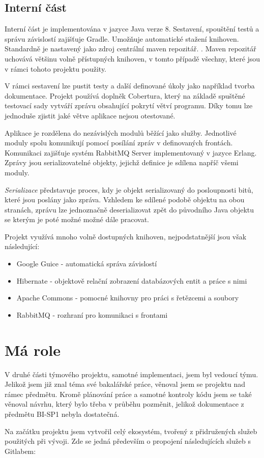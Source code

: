 \documentclass[thesis=B,czech]{FITthesis}[2012/06/26]
\begin{document}
\subsection{Interní část}
Interní část je implementována v jazyce Java verze 8. Sestavení, spouštění testů a správu závislostí zajišťuje Gradle\cite{gradle}.
Umožňuje automatické stažení knihoven. Standardně je nastavený jako zdroj
centrální maven repozitář. \cite{mavenRepo}. Maven repozitář uchovává většinu volně přístupných knihoven, v tomto případě všechny, které jsou v rámci tohoto projektu použity.
\par
V rámci sestavení lze pustit testy a další definované úkoly jako například tvorba dokumentace. Projekt používá
doplněk Cobertura\cite{cobertura}, který na základě spuštěné testovací sady vytváří zprávu obsahující pokrytí větví programu.
Díky tomu lze jednoduše zjistit jaké větve aplikace nejsou otestované.
\par
Aplikace je rozdělena do nezávislých modulů běžící jako služby. Jednotlivé moduly spolu komunikují
pomocí posílání zpráv v definovaných frontách. Komunikaci zajišťuje systém RabbitMQ Server implementovaný v jazyce Erlang. Zprávy jsou serializovatelné objekty, jejichž definice je sdílena napříč všemi moduly.
\par
\textit{Serializace} představuje proces, kdy je objekt serializovaný do posloupnosti bitů, které jsou poslány jako zpráva. 
Vzhledem ke sdílené podobě objektu na obou stranách, zprávu lze jednoznačně deserializovat zpět do původního Java objektu se kterým
je poté možné možné dále pracovat.\cite{serialization}
\par
Projekt využívá mnoho volně dostupných knihoven, nejpodstatnější jsou však následující:
\begin{itemize}
\item Google Guice - automatická správa závislostí \cite{guice}
\item Hibernate - objektově relační zobrazení databázových entit a práce s nimi \cite{hibernate}
\item Apache Commons - pomocné knihovny pro práci s řetězcemi a soubory \cite{commons}
\item RabbitMQ - rozhraní pro komunikaci s frontami \cite{rabbitMQ}
\end{itemize}

\section{Má role}
V druhé části týmového projektu, samotné implementaci, jsem byl vedoucí týmu. Jelikož jsem již znal téma své bakalářské práce, 
věnoval jsem se projektu nad rámec předmětu. Kromě plánování práce a samotné kontroly kódu jsem se také věnoval návrhu, který bylo třeba
v průběhu pozměnit, jelikož dokumentace z předmětu BI-SP1 nebyla dostatečná.
\par
Na začátku projektu jsem vytvořil celý ekosystém, tvořený z přidružených služeb použitých při vývoji.
Zde se jedná především o propojení následujících služeb s Gitlabem:
\end{document}
